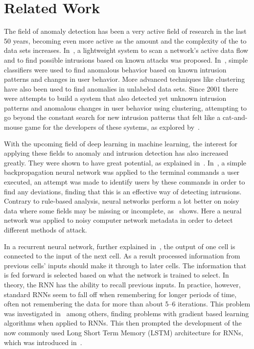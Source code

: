 \chapter{Related Work}\label{ch:related_work}

The field of anomaly detection has been a very active field of research in the last 50 years, becoming even more active as the amount and the complexity of the to data sets increases. In~\cite{roesch1999snort}, a lightweight system to scan a network's active data flow and to find possible intrusions based on known attacks was proposed. In~\cite{lee1998data}, simple classifiers were used to find anomalous behavior based on known intrusion patterns and changes in user behavior. More advanced techniques like clustering have also been used to find anomalies in unlabeled data sets. Since 2001 there were attempts to build a system that also detected yet unknown intrusion patterns and anomalous changes in user behavior using clustering, attempting to go beyond the constant search for new intrusion patterns that felt like a cat-and-mouse game for the developers of these systems, as explored by~\cite{Portnoy01intrusiondetection}.

With the upcoming field of deep learning in machine learning, the interest for applying these fields to anomaly and intrusion detection has also increased greatly. They were shown to have great potential, as explained in~\cite{lecun2015deep}. In~\cite{ryan1998intrusion}, a simple backpropagation neural network was applied to the terminal commands a user executed, an attempt was made to identify users by these commands in order to find any deviations, finding that this is an effective way of detecting intrusions. Contrary to rule-based analysis, neural networks perform a lot better on noisy data where some fields may be missing or incomplete, as~\cite{cannady1998artificial} shows. Here a neural network was applied to noisy computer network metadata in order to detect different methods of attack.

In a recurrent neural network, further explained in~\cite{lecun2015deep}, the output of one cell is connected to the input of the next cell. As a result processed information from previous cells' inputs should make it through to later cells. The information that is fed forward is selected based on what the network is trained to select. In theory, the RNN has the ability to recall previous inputs. In practice, however, standard RNNs seem to fall off when remembering for longer periods of time, often not remembering the data for more than about 5--6 iterations. This problem was investigated in~\cite{bengio1994learning} among others, finding problems with gradient based learning algorithms when applied to RNNs. This then prompted the development of the now commonly used Long Short Term Memory (LSTM) architecture for RNNs, which was introduced in~\cite{hochreiter1997long}.

